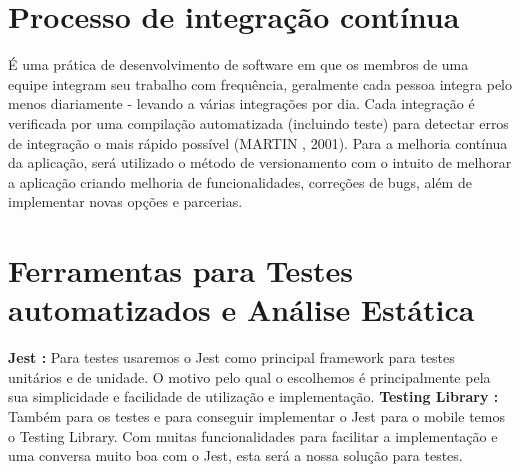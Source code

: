 \section{Processo de integração contínua}
    É uma prática de desenvolvimento de software em que os membros de uma equipe integram seu trabalho com frequência, geralmente cada pessoa integra pelo menos diariamente - levando a várias integrações por dia. Cada integração é verificada por uma compilação automatizada (incluindo teste) para detectar erros de integração o mais rápido possível (MARTIN , 2001).
    Para a melhoria contínua da aplicação, será utilizado o método de versionamento com o intuito de melhorar a aplicação criando melhoria de funcionalidades, correções de bugs, além de implementar novas opções e parcerias.

\section{Ferramentas para Testes automatizados e Análise Estática}
\textbf{Jest :} 
Para testes usaremos o Jest como principal framework para testes unitários e de unidade. O motivo pelo qual o escolhemos é principalmente pela sua simplicidade e facilidade de utilização e implementação.
\textbf{Testing Library :}
Também para os testes e para conseguir implementar o Jest para o mobile temos o Testing Library. Com muitas funcionalidades para facilitar a implementação e uma conversa muito boa com o Jest, esta será a nossa solução para testes.  